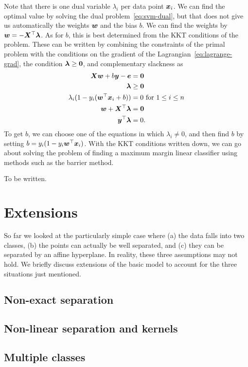 Note that there is one dual variable $\lambda_i$ per data point $\bm{x}_i$. We can find the optimal value by solving the dual problem~\eqref{eq:svm-dual}, but that does not give us automatically the weights $\bm{w}$ and the bias $b$. We can find the weights by $\bm{w}=-\bm{X}^{\top}\bm{\lambda}$. As for $b$, this is best determined from the KKT conditions of the problem. These can be written by combining the constraints of the primal problem with the conditions on the gradient of the Lagrangian~\eqref{eq:lagrange-grad}, the condition $\bm{\lambda}\geq \bm{0}$, and complementary slackness as
\begin{align*}
   \bm{X}\bm{w}+b\bm{y}-\bm{e} &= \bm{0}\\
   \bm{\lambda}&\geq \bm{0}\\
   \lambda_i (1-y_i(\bm{w}^{\top}\bm{x}_i+b)) &= 0 \text{ for } 1\leq i\leq n\\
   \bm{w}+\bm{X}^{\top}\bm{\lambda} &= \bm{0}\\
   \bm{y}^{\top}\bm{\lambda} &= 0.
\end{align*}
To get $b$, we can choose one of the equations in which $\lambda_i\neq 0$, and then find $b$ by setting $b= y_i(1-y_i\bm{w}^{\top}\bm{x}_i)$. With the KKT conditions written down, we can go about solving the problem of finding a maximum margin linear classifier using methods such as the barrier method.

\begin{example}
To be written.
\end{example}

\section{Extensions}
So far we looked at the particularly simple case where (a) the data falls into two classes, (b) the points can actually be well separated, and (c) they can be separated by an affine hyperplane. In reality, these three assumptions may not hold. We briefly discuss extensions of the basic model to account for the three situations just mentioned.

\subsection{Non-exact separation}

\subsection{Non-linear separation and kernels}

\subsection{Multiple classes}

